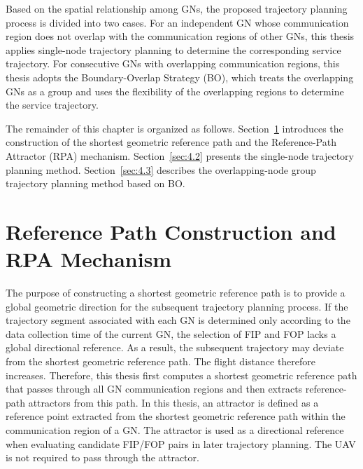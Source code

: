 \documentclass[12pt]{ksthesis}
\begin{document}
\begin{thesis}
{    Based on the spatial relationship among GNs, the proposed trajectory planning process is divided into two cases. For an independent GN whose communication region does not overlap with the communication regions of other GNs, this thesis applies single-node trajectory planning to determine the corresponding service trajectory. For consecutive GNs with overlapping communication regions, this thesis adopts the Boundary-Overlap Strategy (BO), which treats the overlapping GNs as a group and uses the flexibility of the overlapping regions to determine the service trajectory.

    The remainder of this chapter is organized as follows. Section~\ref{sec:4.1} introduces the construction of the shortest geometric reference path and the Reference-Path Attractor (RPA) mechanism. Section~\ref{sec:4.2} presents the single-node trajectory planning method. Section~\ref{sec:4.3} describes the overlapping-node group trajectory planning method based on BO.
    
\section{Reference Path Construction and RPA Mechanism}\label{sec:4.1}


    The purpose of constructing a shortest geometric reference path is to provide a global geometric direction for the subsequent trajectory planning process. If the trajectory segment associated with each GN is determined only according to the data collection time of the current GN, the selection of FIP and FOP lacks a global directional reference. As a result, the subsequent trajectory may deviate from the shortest geometric reference path. The flight distance therefore increases. Therefore, this thesis first computes a shortest geometric reference path that passes through all GN communication regions and then extracts reference-path attractors from this path. In this thesis, an attractor is defined as a reference point extracted from the shortest geometric reference path within the communication region of a GN. The attractor is used as a directional reference when evaluating candidate FIP/FOP pairs in later trajectory planning. The UAV is not required to pass through the attractor.

}
\end{thesis}
\end{document}
